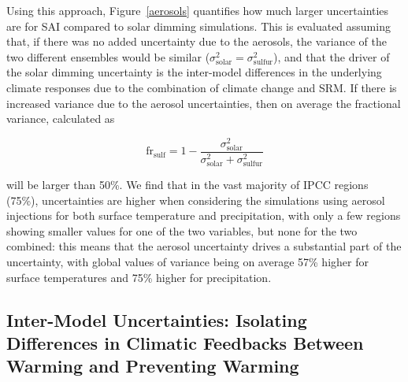 \documentclass[draft]{agujournal2019}
\begin{document}
Using this approach, Figure~\ref{aerosols} quantifies how much larger uncertainties are for SAI compared to solar dimming simulations. This is evaluated assuming that, if there was no added uncertainty due to the aerosols, the variance of the two different ensembles would be similar ($\sigma^2_{\mathrm{solar}} = \sigma^2_{\mathrm{sulfur}}$), and that the driver of the solar dimming uncertainty is the inter-model differences in the underlying climate responses due to the combination of climate change and SRM. If there is increased variance due to the aerosol uncertainties, then on average the fractional variance, calculated as
\begin{linenomath*}
\begin{equation}\label{eqn.frsulf}
\mbox{fr}_{\mathrm{sulf}} = 1 -\frac{\sigma^2_{\mathrm{solar}}}{\sigma^2_{\mathrm{solar}}+\sigma^2_{\mathrm{sulfur}}}
\end{equation}
\end{linenomath*}
will be larger than 50\%. We find that in the vast majority of IPCC regions (75\%), uncertainties are higher when considering the simulations using aerosol injections for both surface temperature and precipitation, with only a few regions showing smaller values for one of the two variables, but none for the two combined: this means that the aerosol uncertainty drives a substantial part of the uncertainty, with global values of variance being on average 57\% higher for surface temperatures and 75\% higher for precipitation.

\subsection{Inter-Model Uncertainties: Isolating Differences in Climatic Feedbacks Between Warming and Preventing Warming}
\end{document}
